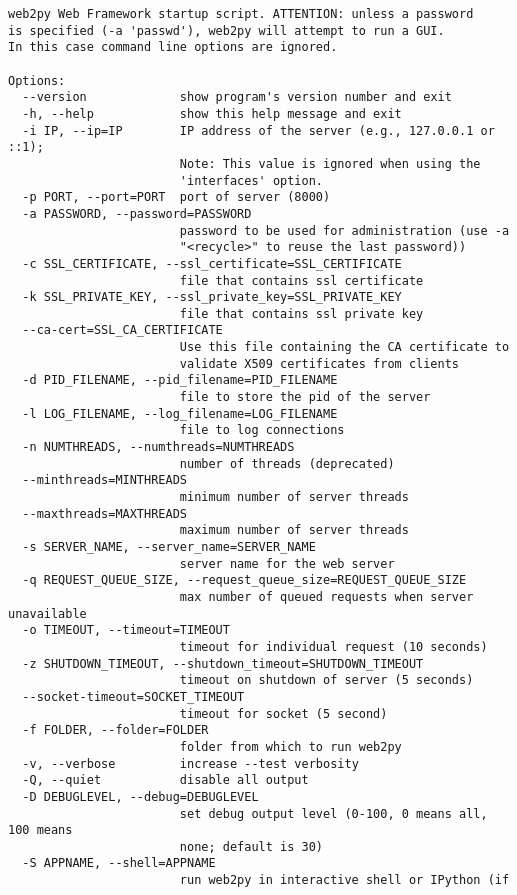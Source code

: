 \documentclass[justified,sixbynine,notoc]{tufte-book}
\begin{document}
\begin{fullwidth}
\begin{lstlisting}
web2py Web Framework startup script. ATTENTION: unless a password
is specified (-a 'passwd'), web2py will attempt to run a GUI.
In this case command line options are ignored.

Options:
  --version             show program's version number and exit
  -h, --help            show this help message and exit
  -i IP, --ip=IP        IP address of the server (e.g., 127.0.0.1 or ::1);
                        Note: This value is ignored when using the
                        'interfaces' option.
  -p PORT, --port=PORT  port of server (8000)
  -a PASSWORD, --password=PASSWORD
                        password to be used for administration (use -a
                        "<recycle>" to reuse the last password))
  -c SSL_CERTIFICATE, --ssl_certificate=SSL_CERTIFICATE
                        file that contains ssl certificate
  -k SSL_PRIVATE_KEY, --ssl_private_key=SSL_PRIVATE_KEY
                        file that contains ssl private key
  --ca-cert=SSL_CA_CERTIFICATE
                        Use this file containing the CA certificate to
                        validate X509 certificates from clients
  -d PID_FILENAME, --pid_filename=PID_FILENAME
                        file to store the pid of the server
  -l LOG_FILENAME, --log_filename=LOG_FILENAME
                        file to log connections
  -n NUMTHREADS, --numthreads=NUMTHREADS
                        number of threads (deprecated)
  --minthreads=MINTHREADS
                        minimum number of server threads
  --maxthreads=MAXTHREADS
                        maximum number of server threads
  -s SERVER_NAME, --server_name=SERVER_NAME
                        server name for the web server
  -q REQUEST_QUEUE_SIZE, --request_queue_size=REQUEST_QUEUE_SIZE
                        max number of queued requests when server unavailable
  -o TIMEOUT, --timeout=TIMEOUT
                        timeout for individual request (10 seconds)
  -z SHUTDOWN_TIMEOUT, --shutdown_timeout=SHUTDOWN_TIMEOUT
                        timeout on shutdown of server (5 seconds)
  --socket-timeout=SOCKET_TIMEOUT
                        timeout for socket (5 second)
  -f FOLDER, --folder=FOLDER
                        folder from which to run web2py
  -v, --verbose         increase --test verbosity
  -Q, --quiet           disable all output
  -D DEBUGLEVEL, --debug=DEBUGLEVEL
                        set debug output level (0-100, 0 means all, 100 means
                        none; default is 30)
  -S APPNAME, --shell=APPNAME
                        run web2py in interactive shell or IPython (if

\end{lstlisting}
\end{fullwidth}
\end{document}
